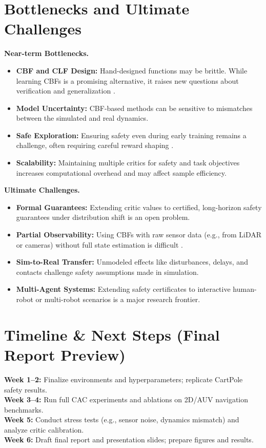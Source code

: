 \documentclass[10pt,conference]{IEEEtran}
\begin{document}
\section{Bottlenecks and Ultimate Challenges}
\textbf{Near-term Bottlenecks.}
\begin{itemize}
    \item \textbf{CBF and CLF Design:} Hand-designed functions may be brittle. While learning CBFs is a promising alternative, it raises new questions about verification and generalization \cite{Guerrier2024Survey,Harms2024NeuralCBF}.
    \item \textbf{Model Uncertainty:} CBF-based methods can be sensitive to mismatches between the simulated and real dynamics.
    \item \textbf{Safe Exploration:} Ensuring safety even during early training remains a challenge, often requiring careful reward shaping \cite{Ranjan2024BarrierShaping}.
    \item \textbf{Scalability:} Maintaining multiple critics for safety and task objectives increases computational overhead and may affect sample efficiency.
\end{itemize}

\textbf{Ultimate Challenges.}
\begin{itemize}
    \item \textbf{Formal Guarantees:} Extending critic values to certified, long-horizon safety guarantees under distribution shift is an open problem.
    \item \textbf{Partial Observability:} Using CBFs with raw sensor data (e.g., from LiDAR or cameras) without full state estimation is difficult \cite{Harms2024NeuralCBF}.
    \item \textbf{Sim-to-Real Transfer:} Unmodeled effects like disturbances, delays, and contacts challenge safety assumptions made in simulation.
    \item \textbf{Multi-Agent Systems:} Extending safety certificates to interactive human-robot or multi-robot scenarios is a major research frontier.
\end{itemize}

\section{Timeline \& Next Steps (Final Report Preview)}
\textbf{Week 1--2:} Finalize environments and hyperparameters; replicate CartPole safety results. \\
\textbf{Week 3--4:} Run full CAC experiments and ablations on 2D/AUV navigation benchmarks.\\
\textbf{Week 5:} Conduct stress tests (e.g., sensor noise, dynamics mismatch) and analyze critic calibration.\\
\textbf{Week 6:} Draft final report and presentation slides; prepare figures and results.
\end{document}
